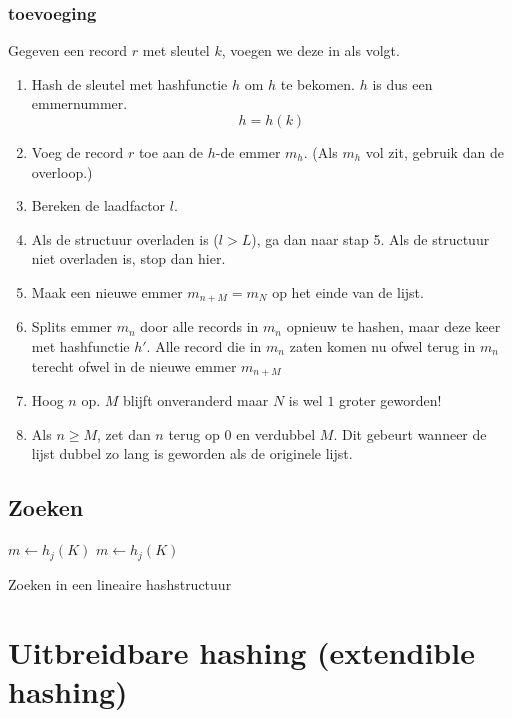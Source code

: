 \documentclass[hashing.tex]{subfiles}
\begin{document}
\subsubsection{toevoeging}
Gegeven een record $r$ met sleutel $k$, voegen we deze in als volgt.
\begin{enumerate}
\item Hash de sleutel met hashfunctie $h$ om $h$ te bekomen. $h$ is dus een emmernummer.
\[
h = h(k)
\]
\item Voeg de record $r$ toe aan de $h$-de emmer $m_h$. (Als $m_h$ vol zit, gebruik dan de overloop.)
\item Bereken de laadfactor $l$. 
\item Als de structuur overladen is ($l> L$), ga dan naar stap 5. Als de structuur niet overladen is, stop dan hier.
\item Maak een nieuwe emmer $m_{n+M}= m_{N}$ op het einde van de lijst.
\item Splits emmer $m_n$ door alle records in $m_n$ opnieuw te hashen, maar deze keer met hashfunctie $h'$. Alle record die in $m_n$ zaten komen nu ofwel terug in $m_n$ terecht ofwel in de nieuwe emmer $m_{n+M}$
\item Hoog $n$ op. $M$ blijft onveranderd maar $N$ is wel $1$ groter geworden!
\item Als $n \ge M$, zet dan $n$ terug op $0$ en verdubbel $M$. Dit gebeurt wanneer de lijst dubbel zo lang is geworden als de originele lijst.

\end{enumerate}


\subsection{Zoeken}
\begin{algorithm}
{$m \leftarrow h_{j}(K)$}
{$m \leftarrow h_{j}(K)$\\
}
\caption{Zoeken in een lineaire hashstructuur}
\end{algorithm}


\section{Uitbreidbare hashing (extendible hashing)}
\end{document}
